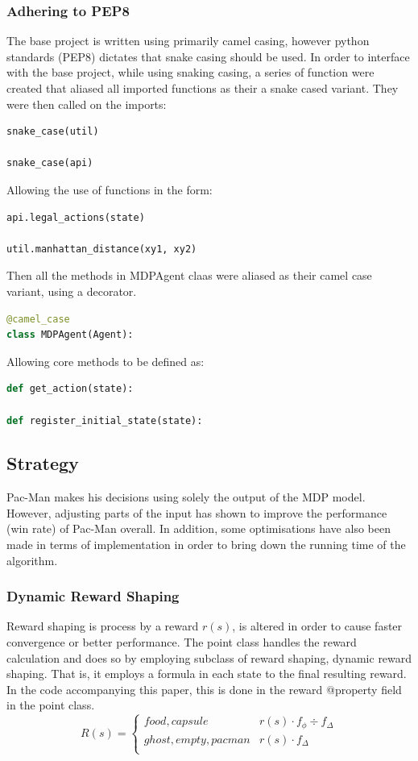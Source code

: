 \documentclass[letterpaper, 11pt, journal, final]{IEEEtran}
\begin{document}
\subsubsection{Adhering to PEP8}
The base project is written using primarily camel casing, however python standards (PEP8) dictates that snake casing should be used. In order to interface with the base project, while using snaking casing, a series of function were created that aliased all imported functions as their a snake cased variant. They were then called on the imports:
\begin{lstlisting}[language=Python]
snake_case(util)

snake_case(api)
\end{lstlisting}
Allowing the use of functions in the form:
\begin{lstlisting}[language=Python]
api.legal_actions(state)

util.manhattan_distance(xy1, xy2)
\end{lstlisting}
Then all the methods in MDPAgent claas were aliased as their camel case variant, using a decorator.
\begin{lstlisting}[language=Python]
@camel_case
class MDPAgent(Agent):
\end{lstlisting}
Allowing core methods to be defined as:
\begin{lstlisting}[language=Python]
def get_action(state):

def register_initial_state(state):
\end{lstlisting}


\subsection{Strategy}
Pac-Man makes his decisions using solely the output of the MDP model. However, adjusting parts of the input has shown to improve the performance (win rate) of Pac-Man overall. In addition, some optimisations have also been made in terms of implementation in order to bring down the running time of the algorithm.

\subsubsection{Dynamic Reward Shaping}
Reward shaping is process by a reward \(r(s)\), is altered in order to cause faster convergence or better performance\cite{RewardShaping}. The point class handles the reward calculation and does so by employing subclass of reward shaping, dynamic reward shaping. That is, it employs a formula in each state to the final resulting reward. In the code accompanying this paper, this is done in the reward @property field in the point class.
\[
R(s) =
\left\{
\begin{array}{ll}
      food, capsule & r(s) \cdot f_\phi \div f_\Delta \\
     ghost, empty, pacman & r(s) \cdot f_\Delta \\
\end{array} 
\right.
\]
\end{document}
